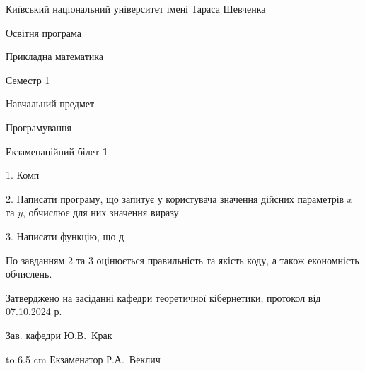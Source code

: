 \documentclass[12pt, ukrainian]{article}
\begin{document}
{{\begin {scriptsize}\par
{ \center  Київський національний університет імені Тараса Шевченка \par}
{\parbox {5 cm}{Освітня програма \hfill}{\parbox {7 cm}{Прикладна математика\hfill}}\parbox {6 cm}{\hfill Семестр 1}}\par
{\parbox {5 cm} {Навчальний предмет \hfill}\parbox {7 cm}{Програмування \hfill}\parbox {6cm}{\hfill}\par}\vspace{-15pt} \end{scriptsize}}{\center Екзаменаційний білет \No \textbf { 1 }\par}}
{%
1. Комп
\par
2. Написати програму, що запитує у користувача значення дійсних параметрів $x$ та $y$, обчислює для них значення виразу 

\par
3. Написати функцію, що д

По завданням 2 та 3 оцінюється правильність та якість коду, а також економність обчислень.

}
{\smallskip\smallskip \begin {scriptsize} Затверджено на засіданні кафедри теоретичної кібернетики, протокол   від   07.10.2024 р.\par\smallskip\smallskip\smallskip\smallskip
{\parbox {6.5 cm} {Зав. кафедри \dotfill Ю.В.~Крак}}\hspace {0.7cm} {\hbox to 6.5 cm { Екзаменатор \dotfill Р.А.~Веклич}} \end{scriptsize}}
\vspace{0.9cm}
\end{document}
